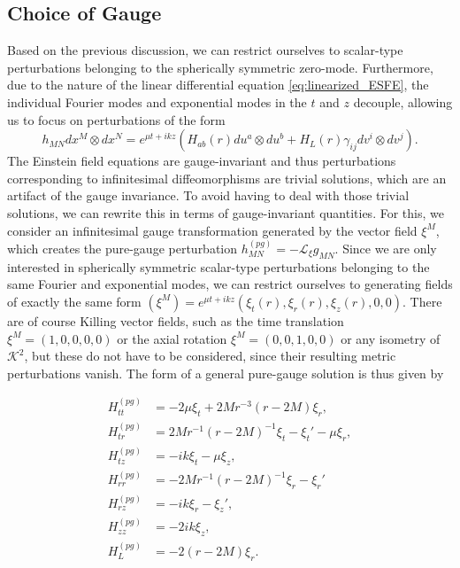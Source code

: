 \documentclass[11pt,aip,jmp,amsmath,amssymb,draft]{revtex4-1}
\begin{document}
\subsection{Choice of Gauge} 
\label{sec:gauge_invariants} 
Based on the previous discussion, we can restrict ourselves to scalar-type perturbations belonging to the spherically symmetric zero-mode. 
Furthermore, due to the nature of the linear differential equation \cref{eq:linearized_ESFE}, the individual Fourier modes and exponential modes in the $t$ and $z$ decouple, allowing us to focus on perturbations of the form
\begin{equation} \label{eq:general_scalar pert}
    h_{MN}dx^M\otimes dx^N = e^{\mu t + ikz} (H_{ab}(r)  du^a\otimes du^b + H_L(r) \gamma_{ij}dv^i \otimes  dv^j).
\end{equation}
The Einstein field equations are gauge-invariant and thus perturbations corresponding to infinitesimal diffeomorphisms are trivial solutions, which are an artifact of the gauge invariance.
To avoid having to deal with those trivial solutions, we can rewrite this in terms of gauge-invariant quantities. For this, we consider an infinitesimal gauge transformation generated by the vector field $\xi^M$, which creates the pure-gauge perturbation $h_{MN}^{(pg)} = -\mathcal L_\xi g_{MN}$.
Since we are only interested in spherically symmetric scalar-type perturbations belonging to the same Fourier and exponential modes, we can restrict ourselves to generating fields of exactly the same form $(\xi^M) = e^{\mu t + ikz} (\xi_t(r), \xi_r(r), \xi_z(r), 0, 0)$. 
There are of course Killing vector fields, such as the time translation $\xi^M = (1,0,0,0,0)$ or the axial rotation $\xi^M = (0,0,1,0,0)$ or any isometry of $\mathcal K^2$, but these do not have to be considered, since their resulting metric perturbations vanish.
The form of a general pure-gauge solution is thus given by

\begin{align}
    H_{tt}^{(pg)} &= - 2 \mu \xi_t + 2 M r^{-3}(r-2 M) \xi_r, \\
    H_{tr}^{(pg)} &= 2 M r^{-1} (r - 2M)^{-1} \xi_t - \xi_t' - \mu \xi_r , \\
    H_{tz}^{(pg)} &= - i k \xi_t - \mu \xi_z , \label{eq:H_tz_pg}\\
    H_{rr}^{(pg)} &= - 2 M r^{-1} (r - 2M)^{-1} \xi_r - \xi_r' \\
    H_{rz}^{(pg)} &= - i k \xi_r - \xi_z', \label{eq:H_rz_pg}\\
    H_{zz}^{(pg)} &= - 2 i k \xi_z, \label{eq:H_zz_pg}\\
    H_L^{(pg)} &= -2 (r - 2 M) \xi_r.
\end{align}
\end{document}
